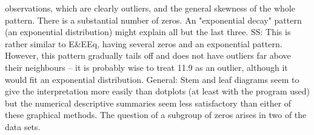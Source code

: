 \documentclass[a4paper,12pt]{article}
\begin{document}
\begin{enumerate}
observations, which are clearly outliers, and the general skewness of the whole
pattern. There is a substantial number of zeros. An "exponential decay" pattern (an
exponential distribution) might explain all but the last three.
SS: This is rather similar to E&EEq, having several zeros and an exponential pattern.
However, this pattern gradually tails off and does not have outliers far above their
neighbours – it is probably wise to treat 11.9 as an outlier, although it would fit an
exponential distribution.
General: Stem and leaf diagrams seem to give the interpretation more easily than
dotplots (at least with the program used) but the numerical descriptive summaries
seem less satisfactory than either of these graphical methods. The question of a subgroup
of zeros arises in two of the data sets.
\end{enumerate}
\end{document}
